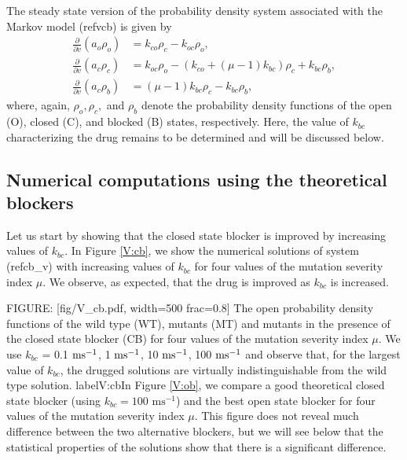 \bigskip The steady state version of the probability density system associated
with the Markov model (ref{vcb}) is given by
\begin{align}
\frac{\partial}{\partial v}\left(  a_{o}\rho_{o}\right)   &  =k_{co}\rho
_{c}-k_{oc}\rho_{o},\nonumber\\
\frac{\partial}{\partial v}\left(  a_{c}\rho_{c}\right)   &  =k_{oc}\rho
_{o}-\left(  k_{co}+\left(  \mu-1\right)  k_{bc}\right)  \rho_{c}+k_{bc}
\rho_{b},\label{cb_v}\\
\frac{\partial}{\partial v}\left(  a_{c}\rho_{b}\right)   &  =\left(
\mu-1\right)  k_{bc}\rho_{c}-k_{bc}\rho_{b},\nonumber
\end{align}
where, again, $\rho_{o},\rho_{c},$ and $\rho_{b}$ denote the probability density
functions of the open (O), closed (C), and blocked (B) states, respectively.
Here, the value of $k_{bc}$ characterizing the drug remains to be determined and
will be discussed below.

\bigskip

\subsection{Numerical computations using the theoretical blockers}

Let us start by showing that the closed state blocker is improved by
increasing values of $k_{bc}.$ In Figure \ref{V:cb}, we show the numerical solutions of system (ref{cb_v}) with
increasing values of $k_{bc}$ for four values of the mutation severity index
$\mu.$ We observe, as expected, that the drug is improved as $k_{bc}$ is increased.

FIGURE: [fig/V_cb.pdf, width=500 frac=0.8] The open probability density functions of the wild type (WT), mutants (MT) and mutants in the presence of the closed state blocker (CB) for four values of the mutation severity index $\mu$. We use $k_{bc}$ = 0.1 $\rm{ms^{-1}}$, 1 $\rm{ms^{-1}}$, 10 $\rm{ms^{-1}}$, 100 $\rm{ms^{-1}}$ and observe that, for the largest value of $k_{bc}$, the drugged solutions are virtually indistinguishable from the wild type solution. label{V:cb}In Figure \ref{V:ob}, we compare a good theoretical closed state blocker (using $k_{bc}=100\text{ ms}^{-1}$) and the best
open state blocker for four values of the mutation severity index $\mu$. This figure does not reveal
much difference between the two alternative blockers, but we will see below that
the statistical properties
of the solutions show that there is a significant difference.


